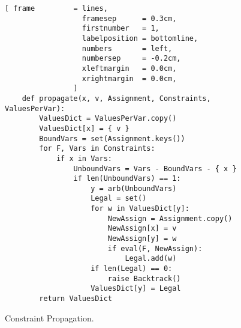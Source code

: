 \begin{figure}[!ht]
\centering
\begin{Verbatim}[ frame         = lines, 
                  framesep      = 0.3cm, 
                  firstnumber   = 1,
                  labelposition = bottomline,
                  numbers       = left,
                  numbersep     = -0.2cm,
                  xleftmargin   = 0.0cm,
                  xrightmargin  = 0.0cm,
                ]
    def propagate(x, v, Assignment, Constraints, ValuesPerVar):
        ValuesDict = ValuesPerVar.copy()
        ValuesDict[x] = { v }
        BoundVars = set(Assignment.keys())
        for F, Vars in Constraints:
            if x in Vars:
                UnboundVars = Vars - BoundVars - { x }
                if len(UnboundVars) == 1:
                    y = arb(UnboundVars)
                    Legal = set()
                    for w in ValuesDict[y]:
                        NewAssign = Assignment.copy()
                        NewAssign[x] = v
                        NewAssign[y] = w
                        if eval(F, NewAssign):
                            Legal.add(w)
                    if len(Legal) == 0:
                        raise Backtrack()
                    ValuesDict[y] = Legal
        return ValuesDict
\end{Verbatim}
\vspace*{-0.3cm}
\caption{Constraint Propagation.}
\label{fig:Constraint-Propagation-Solver.ipynb:propagate}
\end{figure}

